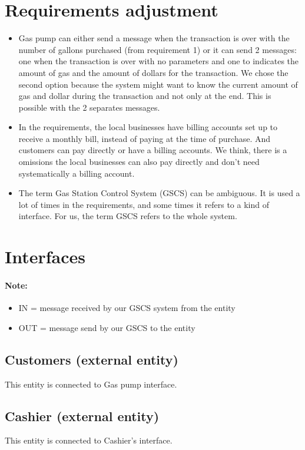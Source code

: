 \documentclass[11pt,a4paper]{article}
\begin{document}
\section{Requirements adjustment}
\begin{itemize}
	\item Gas pump can either send a message when the transaction is over with the number of gallons purchased (from requirement 1) or it can send 2 messages: one when the transaction is over with no parameters and one to indicates the amount of gas and the amount of dollars for the transaction.
We chose the second option because the system might want to know the current amount of gas and dollar during the transaction and not only at the end. This is possible with the 2 separates messages.
	\item In the requirements, the local businesses have billing accounts set up to receive a monthly bill, instead of paying at the time of purchase. And customers can pay directly or have a billing accounts. 
We think, there is a omissions the local businesses can also pay directly and don't need systematically a billing account.
	\item The term Gas Station Control System (GSCS) can be ambiguous. It is used a lot of times in the requirements, and some times it refers to a kind of interface. For us, the term GSCS refers to the whole system.
\end{itemize}


\section{Interfaces}

\paragraph{Note:}  
\begin{itemize}
\item IN = message received by our GSCS system from the entity
\item OUT = message send by our GSCS to the entity
\end{itemize}


\subsection{Customers (external entity)}
This entity is connected to Gas pump interface.
\subsection{Cashier (external entity)}
This entity is connected to Cashier's interface.
\end{document}
